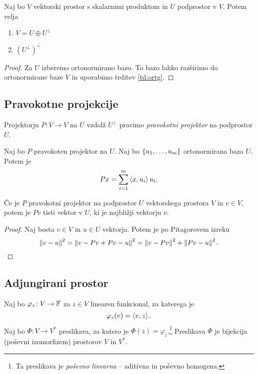 \documentclass[12pt, a4paper]{article}
\begin{document}
\begin{izrek}
Naj bo $V$ vektorski prostor s skalarnimi produktom in $U$ podprostor v $V$. Potem velja

\begin{enumerate}[label=\roman*)]
\item $V=U\oplus U^\bot$
\item $\left(U^\bot\right)^\bot$
\end{enumerate}
\end{izrek}

\begin{proof}
Za $U$ izberemo ortonormirano bazo. To bazo lahko razširimo do ortonormirane baze $V$ in uporabimo trditev \ref{td:ortg}.
\end{proof}

\newpage

\subsection{Pravokotne projekcije}

\begin{definicija}
Projektorju $P\colon V\to V$ na $U$ vzdolž $U^\bot$ pravimo \emph{pravokotni projektor} na podprostor $U$.
\end{definicija}

\begin{opomba}
Naj bo $P$ pravokoten projektor na $U$. Naj bo $\left\{u_1,\dots,u_m\right\}$ ortonormirana baza $U$. Potem je
\[
Px=\sum_{i=1}^m\left\langle x,u_i\right\rangle u_i.
\]
\end{opomba}

\begin{izrek}
Če je $P$ pravokotni projektor na podprostor $U$ vektorskega prostora $V$ in $v\in V$, potem je $Pv$ tisti vektor v $U$, ki je najbližji vektorju $v$.
\end{izrek}

\begin{proof}
Naj bosta $v\in V$ in $u\in U$ vektorja. Potem je po Pitagorovem izreku
\[
\left\lVert v-u\right\rVert^2=\left\lVert v-Pv+Pv-u\right\rVert^2=\left\lVert v-Pv\right\rVert^2+\left\lVert Pv-u\right\rVert^2.\qedhere
\]
\end{proof}

\newpage

\subsection{Adjungirani prostor}

\begin{izrek}[Riesz]
Naj bo $\varphi_z\colon V\to\mathbb{F}$ za $z\in V$ linearen funkcional, za katerega je
\[
\varphi_z(v)=\left\langle v,z\right\rangle.
\]
Naj bo $\Phi\colon V\to V^*$ preslikava, za katero je $\Phi(z)=\varphi_z$.\footnote{Ta preslikava je \emph{poševno linearna} -- aditivna in poševno homogena.} Preslikava $\Phi$ je bijekcija (poševni izomorfizem) prostorov $V$ in $V^*$.
\end{izrek}
\end{document}
